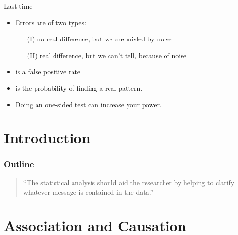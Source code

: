 
\subtitle{and statistical significance}

\date{14 October 2015}




\begin{frame}
  \maketitle
\end{frame}

\begin{frame}{Last time}

    \begin{itemize}
        \item Errors are of two types: 
            \begin{itemize}
                \item[(I)] \alert{no} real difference, but we are misled by noise
                \item[(II)] \alert{real} difference, but we can't tell, because of noise
            \end{itemize}
        \item {} is a false positive rate 
        \item {} is the probability of finding a real pattern.
        \item Doing an \alert{one-sided} test can increase your power.
    \end{itemize}

\end{frame}

\section*{Introduction}
\begin{frame}\frametitle<presentation>{Outline}
  \begin{quote}
    ``The statistical analysis should aid the researcher by helping to clarify whatever
    message is contained in the data.''
  \end{quote}
  \tableofcontents
\end{frame}


\section{Association and Causation}


